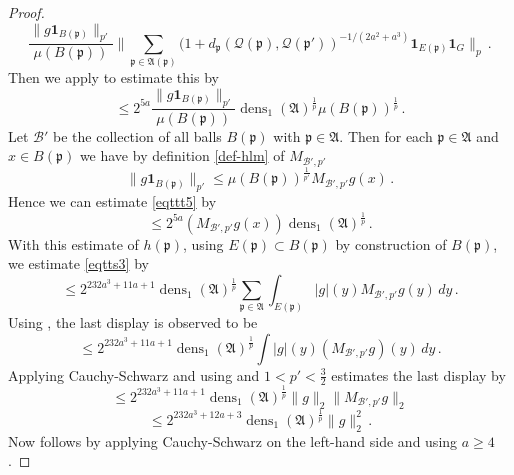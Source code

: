 \documentclass[10pt,a4paper]{article}
\theoremstyle{plain}
\theoremstyle{definition}
\numberwithin{equation}{subsection}
\DeclareMathOperator{\dens}{\operatorname{dens}}
\newcommand{\fp}{{\mathfrak p}}
\newcommand{\fcc}{{\mathcal{Q}}}
\begin{document}
\begin{proof}
\begin{equation}
    \frac{\|g\mathbf{1}_{B(\fp)}\|_{p'}}{\mu(B(\fp))}
    \Big\|\sum_{\fp\in\mathfrak{A}(\fp)}(1+d_{\fp}(\fcc(\fp), \fcc(\fp'))^{-1/(2a^2+a^3)}\mathbf{1}_{E(\fp)}\mathbf{1}_G\Big\|_{p}\, .
\end{equation}
Then we apply  to estimate this by
\begin{equation}\label{eqttt5}
    \le 2^{5a}
    \frac{\|g\mathbf{1}_{B(\fp)}\|_{p'}}{\mu(B(\fp))}
    \dens_1(\mathfrak{A})^{\frac 1p}\mu(B(\fp))^{\frac 1p}\,.
\end{equation}
Let $\mathcal{B}'$ be the collection of all balls
$B(\fp)$ with $\fp\in \mathfrak{A}$. Then
for each $\fp\in \mathfrak{A}$ and $x\in B(\fp)$ we have by
definition \eqref{def-hlm} of $M_{\mathcal{B}',p'}$
\begin{equation}
    \|g\mathbf{1}_{B(\fp)}\|_{p'}\le
    \mu(B(\fp))^{\frac 1{p'}} M_{\mathcal{B}',p'}g(x) \, .
\end{equation}
Hence we can estimate \eqref{eqttt5} by
\begin{equation}
\label{eqttt5b}
    \le
    2^{5a}
    (M_{\mathcal{B}', p'}g(x))
   \dens_1(\mathfrak{A})^{\frac 1p}\, .
\end{equation}
With this estimate of $h(\fp)$, using $E(\fp)\subset B(\fp)$ by construction of $B(\fp)$, we estimate \eqref{eqtts3} by
 \begin{equation}\label{eqtts4}
 \le 2^{232a^3+11a + 1} { \dens_1(\mathfrak{A})^{\frac 1p}}\sum_{\fp\in \mathfrak{A}}
 \int_{E(\fp)}|g|(y)M_{\mathcal{B}', p'}g(y) \, dy\,.
         \end{equation}
Using , the last display is observed to be
\begin{equation}\label{eqtts4a}
\le 2^{232a^3+11a + 1}
 {\dens_1(\mathfrak{A})^{\frac 1p}} \int |g|(y)(M_{\mathcal{B}', p'}g)(y) \, dy\,.
         \end{equation}
Applying Cauchy-Schwarz and using  and $1<p'<\frac 32$ estimates the last display by
\begin{equation}
    \le 2^{232a^3+11a + 1} \dens_1(\mathfrak{A})^{\frac 1p}
    \|g\|_2 \|M_{\mathcal{B}', p'} g\|_2
\end{equation}
\begin{equation}
    \le 2^{232a^3+12a+3} \dens_1(\mathfrak{A})^{\frac 1p}\|g\|_2 ^2\,.
\end{equation}
Now  follows by applying Cauchy-Schwarz on the left-hand side and using $a\ge 4$.
\end{proof}
\end{document}
